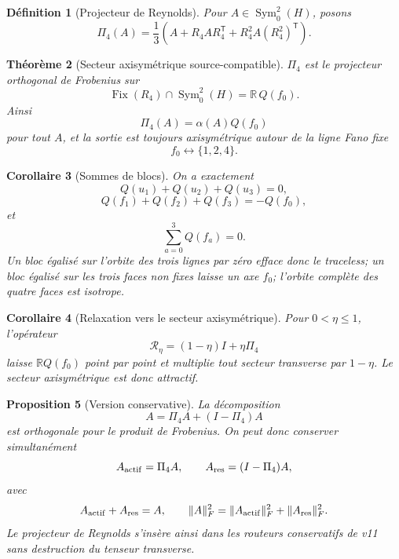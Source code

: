 \documentclass[11pt,a4paper]{article}
\newtheorem{theorem}{Théorème}[section]
\newtheorem{proposition}[theorem]{Proposition}
\newtheorem{corollary}[theorem]{Corollaire}
\newtheorem{definition}[theorem]{Définition}
\newcommand{\R}{\mathbb R}
\begin{document}
\begin{definition}[Projecteur de Reynolds]\label{def:v14-Reynolds}
Pour $A\in\operatorname{Sym}_0^2(H)$, posons
\begin{equation}\label{eq:v14-Reynolds}
 \boxed{
 \Pi_4(A)
 =
 \frac13
 \left(
 A+R_4AR_4^{\mathsf T}
 +R_4^2A(R_4^2)^{\mathsf T}
 \right).}
\end{equation}
\end{definition}

\begin{theorem}[Secteur axisymétrique source-compatible]\label{thm:v14-Reynolds}
$\Pi_4$ est le projecteur orthogonal de Frobenius sur
\[
 \operatorname{Fix}(R_4)
 \cap\operatorname{Sym}_0^2(H)
 =
 \R\,Q(f_0).
\]
Ainsi
\begin{equation}\label{eq:v14-Reynolds-image}
 \boxed{
 \Pi_4(A)=\alpha(A)Q(f_0)}
\end{equation}
pour tout $A$, et la sortie est toujours axisymétrique autour de la ligne Fano fixe
\[
 f_0\leftrightarrow\{1,2,4\}.
\]
\end{theorem}

\begin{corollary}[Sommes de blocs]\label{cor:v14-orbit-sums}
On a exactement
\[
 Q(u_1)+Q(u_2)+Q(u_3)=0,
\]
\[
 Q(f_1)+Q(f_2)+Q(f_3)=-Q(f_0),
\]
et
\[
 \sum_{a=0}^{3}Q(f_a)=0.
\]
Un bloc égalisé sur l'orbite des trois lignes par zéro efface donc le traceless; un bloc égalisé sur les trois faces non fixes laisse un axe $f_0$; l'orbite complète des quatre faces est isotrope.
\end{corollary}

\begin{corollary}[Relaxation vers le secteur axisymétrique]\label{cor:v14-axis-relax}
Pour $0<\eta\le1$, l'opérateur
\[
 \mathcal R_\eta
 =
 (1-\eta)I+\eta\Pi_4
\]
laisse $\R Q(f_0)$ point par point et multiplie tout secteur transverse par $1-\eta$. Le secteur axisymétrique est donc attractif.
\end{corollary}

\begin{proposition}[Version conservative]\label{prop:v14-conservative-Reynolds}
La décomposition
\[
 A=\Pi_4A+(I-\Pi_4)A
\]
est orthogonale pour le produit de Frobenius. On peut donc conserver simultanément
\[
 A_{\rm actif}=\Pi_4A,
 \qquad
 A_{\rm res}=(I-\Pi_4)A,
\]
avec
\[
 A_{\rm actif}+A_{\rm res}=A,
\qquad
 \|A\|_F^2
 =
 \|A_{\rm actif}\|_F^2+\|A_{\rm res}\|_F^2.
\]
Le projecteur de Reynolds s'insère ainsi dans les routeurs conservatifs de v11 sans destruction du tenseur transverse.
\end{proposition}
\end{document}
